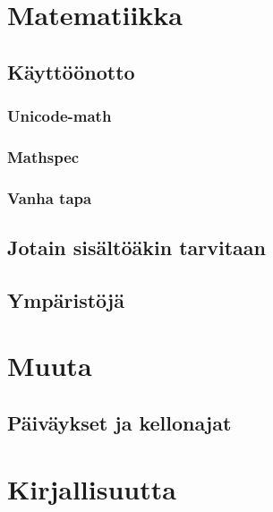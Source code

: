 \documentclass[notitlepage,oneside]{book}
\begin{document}
\clearpage


\clearpage
\restoregeometry
{}

{
  \renewcommand{\thispagestyle}[1]{}
  \tableofcontents
}

\clearpage
\pagestyle{plain}







\chapter{Matematiikka}
\label{luku:matematiikka}
\section{Käyttöönotto}
\subsection{Unicode-math}
\subsection{Mathspec}
\subsection{Vanha tapa}
\section{Jotain sisältöäkin tarvitaan}
\section{Ympäristöjä}

\chapter{Muuta}
\section{Päiväykset ja kellonajat}

\backmatter
\chapter{Kirjallisuutta}
\end{document}
